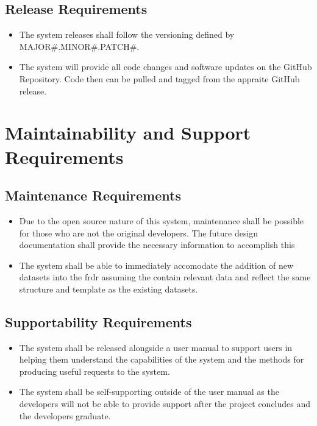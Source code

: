 \documentclass[12pt]{article}
\begin{document}
\subsection{Release Requirements}
\begin{itemize}
    \item The system releases shall follow the versioning defined by MAJOR\#.MINOR\#.PATCH\#.
    \item The system will provide all code changes and software updates on the GitHub Repository. Code then can be pulled and tagged from the appraite GitHub release.
\end{itemize}


\section{Maintainability and Support Requirements}
\subsection{Maintenance Requirements}

\begin{itemize}
    \item Due to the open source nature of this system, maintenance shall be possible for those who are not the original developers.
    The future design documentation shall provide the necessary information to accomplish this
    \item The system shall be able to immediately accomodate the addition of new datasets into the \gls{frdr}
    assuming the contain relevant data and reflect the same structure and template as the existing datasets.
\end{itemize}

\subsection{Supportability Requirements}

\begin{itemize}
    \item The system shall be released alongside a user manual to support users in helping them understand
    the capabilities of the system and the methods for producing useful requests to the system.
    \item The system shall be self-supporting outside of the user manual as the developers will not be able
    to provide support after the project concludes and the developers graduate.
\end{itemize}
\end{document}
